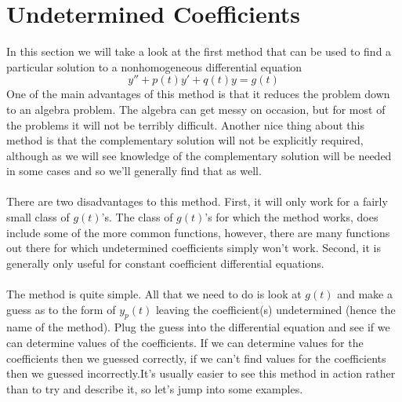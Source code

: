 \documentclass[10pt,reqno]{book}
\theoremstyle{definition}
\begin{document}
	\section{Undetermined Coefficients}

	In this section we will take a look at the first method that can be used to find a particular solution to a nonhomogeneous differential equation
	\[ y'' + p(t)y' + q(t)y = g(t) \]
	One of the main advantages of this method is that it reduces the problem down to an algebra problem. The algebra can get messy on occasion, but for most of the problems it will not be terribly difficult. Another nice thing about this method is that the complementary solution will not be explicitly required, although as we will see knowledge of the complementary solution will be needed in some cases and so we'll generally find that as well.\\ \\
	There are two disadvantages to this method.  First, it will only work for a fairly small class of $ g(t) $'s.  The class of $ g(t) $'s for which the method works, does include some of the more common functions, however, there are many functions out there for which undetermined coefficients simply won't work. Second, it is generally only useful for constant coefficient differential equations.\\ \\
	The method is quite simple. All that we need to do is look at $ g(t) $ and make a guess as to the form of $ y_p(t) $ leaving the coefficient(s) undetermined (hence the name of the method). Plug the guess into the differential equation and see if we can determine values of the coefficients. If we can determine values for the coefficients then we guessed correctly, if we can’t find values for the coefficients then we guessed incorrectly.It's usually easier to see this method in action rather than to try and describe it, so let's jump into some examples.
\end{document}

